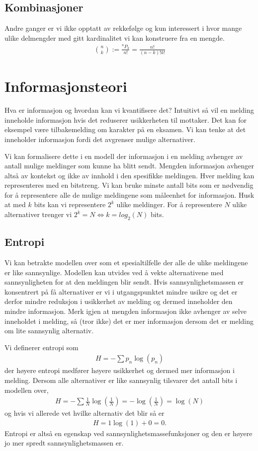 \subsection{Kombinasjoner}
Andre ganger er vi ikke opptatt av rekkefølge og kun interessert i hvor mange ulike delmengder med gitt kardinalitet vi kan konstruere fra en mengde. 
\begin{align}
{n\choose k}:=\frac{^nP_k}{n!}=\frac{n!}{(n-k)!k!}
\end{align}
\section{Informasjonsteori}
Hva er informasjon og hvordan kan vi kvantifisere det? Intuitivt så vil en melding inneholde informasjon hvis det reduserer usikkerheten til mottaker. Det kan for eksempel være tilbakemelding om karakter på en eksamen. Vi kan tenke at det inneholder informasjon fordi det avgrenser mulige alternativer.

Vi kan formalisere dette i en modell der informasjon i en melding avhenger av antall mulige meldinger som kunne ha blitt sendt. Mengden informasjon avhenger altså av kontekst og ikke av innhold i den spesifikke meldingen. Hver melding kan representeres med en bitstreng. Vi kan bruke minste antall bits som er nødvendig for å representere alle de mulige meldingene som måleenhet for informasjon. Husk at med $k$ bits kan vi representere $2^k$ ulike meldinger. For å representere $N$ ulike alternativer trenger vi $2^k=N \iff k = log_2(N)$ bits. 
\subsection{Entropi}
Vi kan betrakte modellen over som et spesialtilfelle der alle de ulike meldingene er like sannsynlige. Modellen kan utvides ved å vekte alternativene med sannsynligheten for at den meldingen blir sendt. Hvis sannsynlighetsmassen er konsentrert på få alternativer er vi i utgangspunktet mindre usikre og det er derfor mindre reduksjon i usikkerhet av melding og dermed inneholder den mindre informasjon. Merk igjen at mengden informasjon ikke avhenger av selve inneholdet i melding, så (tror ikke) det er mer informasjon dersom det er melding om lite sannsynlig alternativ.

Vi definerer entropi som
\begin{align}
H = -\sum p_n\log(p_n)
\end{align}
der høyere entropi medfører høyere usikkerhet og dermed mer informasjon i melding. Dersom alle alternativer er like sannsynlig tilsvarer det antall bits i modellen over,
\begin{align}
H = -\sum \frac{1}{N}\log(\frac{1}{N}) = -\log(\frac{1}{N}) = \log(N)
\end{align}
og hvis vi allerede vet hvilke alternativ det blir så er
\begin{align}
H = 1\log(1) +0 = 0.
\end{align}
Entropi er altså en egenskap ved sannsynlighetsmassefunksjoner og den er høyere jo mer spredt sannsynlighetsmassen er.
